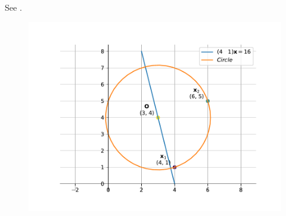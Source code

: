 See .
\begin{figure}[H]
	\begin{center} 
	    \includegraphics[width=0.75\columnwidth]{chapters/11/11/1/10/figs/fig.pdf}
	\end{center}
\caption{}
\label{fig:chapters/11/11/1/10Fig1}
\end{figure}





